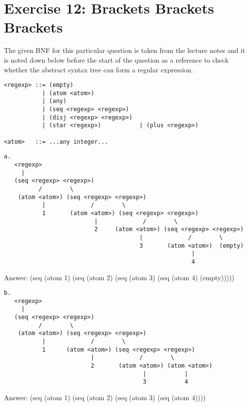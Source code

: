 \documentclass{article}
\begin{document}
\newpage
\section{Exercise 12: Brackets Brackets Brackets}

The given BNF for this particular question is taken from the lecture notes and it is noted down below before the start of the question as a reference to check whether the abstract syntax tree can form a regular expression. 

\begin{lstlisting}
<regexp> ::= (empty)
           | (atom <atom>)
           | (any)
           | (seq <regexp> <regexp>)
           | (disj <regexp> <regexp>)
           | (star <regexp>)           | (plus <regexp>)

<atom>   ::= ...any integer...
\end{lstlisting}

\begin{lstlisting}
a.
   <regexp>
     |
   (seq <regexp> <regexp>)
          /        \
    (atom <atom>) (seq <regexp> <regexp>)
           |             /        \
           1       (atom <atom>) (seq <regexp> <regexp>)
                          |             /        \
                          2     (atom <atom>) (seq <regexp> <regexp>)
                                       |             /        \
                                       3       (atom <atom>)  (empty)
                                                      |
                                                      4
\end{lstlisting} \linebreak
Answer: (seq (atom 1) (seq (atom 2) (seq (atom 3) (seq (atom 4) (empty)))))

\begin{lstlisting}
b.
   <regexp>
     |
   (seq <regexp> <regexp>)
          /        \
    (atom <atom>) (seq <regexp> <regexp>)
           |             /        \
           1      (atom <atom>) (seq <regexp> <regexp>)
                         |             /        \
                         2       (atom <atom>) (atom <atom>)
                                        |           |
                                        3           4
\end{lstlisting}
Answer: (seq (atom 1) (seq (atom 2) (seq (atom 3) (seq (atom 4))))
\end{document}
